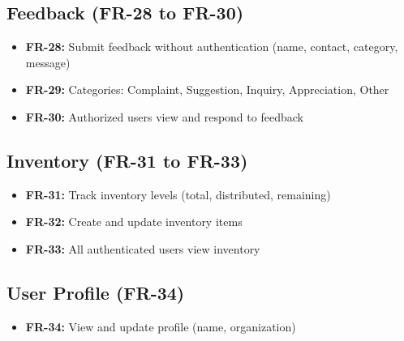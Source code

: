 \subsection{Feedback (FR-28 to FR-30)}
\begin{itemize}[nosep]
    \item \textbf{FR-28:} Submit feedback without authentication (name, contact, category, message)
    \item \textbf{FR-29:} Categories: Complaint, Suggestion, Inquiry, Appreciation, Other
    \item \textbf{FR-30:} Authorized users view and respond to feedback
\end{itemize}

\subsection{Inventory (FR-31 to FR-33)}
\begin{itemize}[nosep]
    \item \textbf{FR-31:} Track inventory levels (total, distributed, remaining)
    \item \textbf{FR-32:} Create and update inventory items
    \item \textbf{FR-33:} All authenticated users view inventory
\end{itemize}

\subsection{User Profile (FR-34)}
\begin{itemize}[nosep]
    \item \textbf{FR-34:} View and update profile (name, organization)
\end{itemize}

